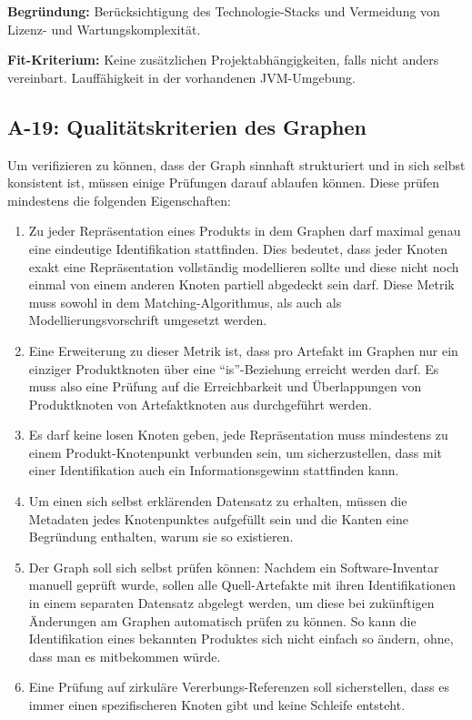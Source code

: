 \textbf{Begründung:}
Berücksichtigung des Technologie-Stacks und Vermeidung von Lizenz- und Wartungskomplexität.

\textbf{Fit-Kriterium:}
Keine zusätzlichen Projektabhängigkeiten, falls nicht anders vereinbart.
Lauffähigkeit in der vorhandenen JVM-Umgebung.

\subsection{A-19: Qualitätskriterien des Graphen}\label{subsec:req-graph-inner-consistency}

Um verifizieren zu können, dass der Graph sinnhaft strukturiert und in sich selbst konsistent ist, müssen einige Prüfungen darauf ablaufen können.
Diese prüfen mindestens die folgenden Eigenschaften:

\begin{enumerate}
    \item Zu jeder Repräsentation eines Produkts in dem Graphen darf maximal genau eine eindeutige Identifikation stattfinden.
    Dies bedeutet, dass jeder Knoten exakt eine Repräsentation vollständig modellieren sollte und diese nicht noch einmal von einem anderen Knoten partiell abgedeckt sein darf.
    Diese Metrik muss sowohl in dem Matching-Algorithmus, als auch als Modellierungsvorschrift umgesetzt werden.
    \item Eine Erweiterung zu dieser Metrik ist, dass pro Artefakt im Graphen nur ein einziger Produktknoten über eine \enquote{is}-Beziehung erreicht werden darf.
    Es muss also eine Prüfung auf die Erreichbarkeit und Überlappungen von Produktknoten von Artefaktknoten aus durchgeführt werden.
    \item Es darf keine losen Knoten geben, jede Repräsentation muss mindestens zu einem Produkt-Knotenpunkt verbunden sein, um sicherzustellen, dass mit einer Identifikation auch ein Informationsgewinn stattfinden kann.
    \item Um einen sich selbst erklärenden Datensatz zu erhalten, müssen die Metadaten jedes Knotenpunktes aufgefüllt sein und die Kanten eine Begründung enthalten, warum sie so existieren.
    \item Der Graph soll sich selbst prüfen können: Nachdem ein Software-Inventar manuell geprüft wurde, sollen alle Quell-Artefakte mit ihren Identifikationen in einem separaten Datensatz abgelegt werden, um diese bei zukünftigen Änderungen am Graphen automatisch prüfen zu können.
    So kann die Identifikation eines bekannten Produktes sich nicht einfach so ändern, ohne, dass man es mitbekommen würde.
    \item Eine Prüfung auf zirkuläre Vererbungs-Referenzen soll sicherstellen, dass es immer einen spezifischeren Knoten gibt und keine Schleife entsteht.
\end{enumerate}
